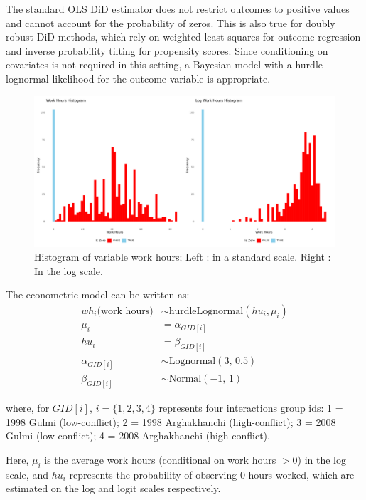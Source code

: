 \documentclass[12pt,a4paper]{article}
\begin{document}
The standard OLS DiD estimator does not restrict outcomes to positive values and cannot account for the probability of zeros. This is also true for doubly robust DiD methods, which rely on weighted least squares for outcome regression and inverse probability tilting for propensity scores. Since conditioning on covariates is not required in this setting, a Bayesian model with a hurdle lognormal likelihood for the outcome variable is appropriate.

\begin{figure}[H]
	\centering
	\includegraphics[width=1\textwidth]{../Analysis files/wh_histogram.jpg}
	\caption{Histogram of variable work hours; Left : in a standard scale. Right : In the log scale.}
	\label{fig:wh_histogram}
\end{figure}

The econometric model can be written as:
\begin{align*}
	wh_{i} \text{(work hours)} &\sim \text{hurdleLognormal}(hu_i, \mu_i) \\
	\mu_{i} &= \alpha_{GID[i]} \\
	hu_{i} &= \beta_{GID[i]} \\
	\alpha_{GID[i]} &\sim \text{Lognormal}(3,\, 0.5) \\
	\beta_{GID[i]} &\sim \text{Normal}(-1,\, 1)
\end{align*}

where, for $GID[i]$, $i = \{ 1, 2, 3, 4\}$ represents four interactions group ids: 1 = 1998 Gulmi (low-conflict); 2 = 1998 Arghakhanchi (high-conflict); 3 = 2008 Gulmi (low-conflict); 4 = 2008 Arghakhanchi (high-conflict).

Here, $\mu_i$ is the average work hours (conditional on work hours $> 0$) in the log scale, and $hu_i$ represents the probability of observing $0$ hours worked, which are estimated on the log and logit scales respectively.
\end{document}
